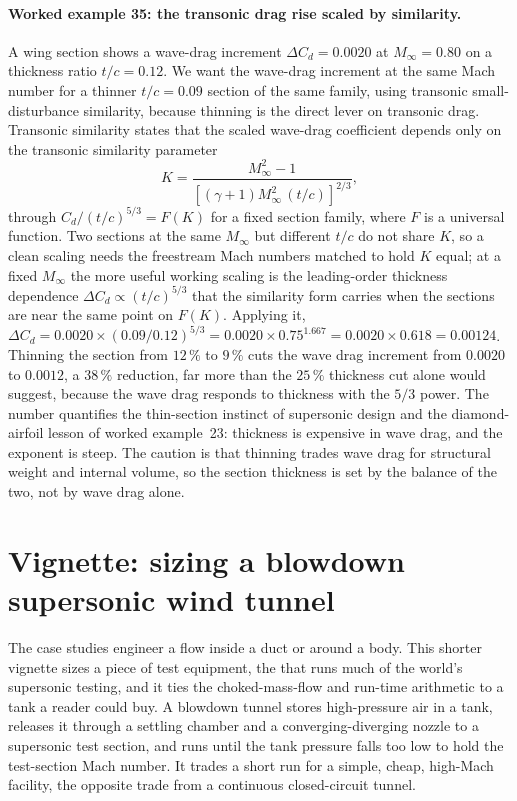 \paragraph{Worked example 35: the transonic drag rise scaled by
similarity.} A wing section shows a wave-drag increment
$\Delta C_d = 0.0020$ at $M_\infty = 0.80$ on a thickness ratio
$t/c = 0.12$. We want the wave-drag increment at the same Mach number
for a thinner $t/c = 0.09$ section of the same family, using transonic
small-disturbance similarity, because thinning is the direct lever on
transonic drag. Transonic similarity states that the scaled wave-drag
coefficient depends only on the transonic similarity parameter
\[
K = \frac{M_\infty^2 - 1}{[(\gamma + 1)M_\infty^2\,(t/c)]^{2/3}},
\]
through $C_d/(t/c)^{5/3} = F(K)$ for a fixed section family, where $F$
is a universal function. Two sections at the same $M_\infty$ but
different $t/c$ do not share $K$, so a clean scaling needs the
freestream Mach numbers matched to hold $K$ equal; at a fixed
$M_\infty$ the more useful working scaling is the leading-order
thickness dependence $\Delta C_d \propto (t/c)^{5/3}$ that the
similarity form carries when the sections are near the same point on
$F(K)$. Applying it, $\Delta C_d = 0.0020\times
(0.09/0.12)^{5/3} = 0.0020\times 0.75^{1.667} = 0.0020\times 0.618 =
0.00124$. Thinning the section from $12\,\%$ to $9\,\%$ cuts the wave
drag increment from $0.0020$ to $0.0012$, a $38\,\%$ reduction, far more
than the $25\,\%$ thickness cut alone would suggest, because the wave
drag responds to thickness with the $5/3$ power. The number quantifies
the thin-section instinct of supersonic design and the diamond-airfoil
lesson of worked example~23: thickness is expensive in wave drag, and
the exponent is steep. The caution is that thinning trades wave drag for
structural weight and internal volume, so the section thickness is set
by the balance of the two, not by wave drag alone.

\section{Vignette: sizing a blowdown supersonic wind tunnel}

The case studies engineer a flow inside a duct or around a body. This
shorter vignette sizes a piece of test equipment, the
 that runs much of the world's
supersonic testing, and it ties the choked-mass-flow and run-time
arithmetic to a tank a reader could buy. A blowdown tunnel stores
high-pressure air in a tank, releases it through a settling chamber and
a converging-diverging nozzle to a supersonic test section, and runs
until the tank pressure falls too low to hold the test-section Mach
number. It trades a short run for a simple, cheap, high-Mach facility,
the opposite trade from a continuous closed-circuit tunnel.

